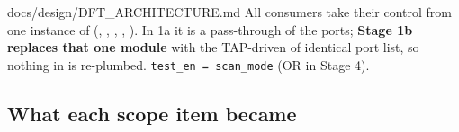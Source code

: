 \begin{relocated}{docs/design/DFT_ARCHITECTURE.md}
All consumers take their control from one instance of
 (,
, , ,
). In 1a it is a pass-through of the ports;
\textbf{Stage 1b replaces that one module} with the TAP-driven
 of identical port list, so nothing in  is
re-plumbed.
\texttt{test\_\allowbreak{}en\ =\allowbreak{}\ scan\_\allowbreak{}mode}
(OR  in Stage 4).

\subsection{What each scope item became}\label{tm:ch:dft-architecture:142-what-each-scope-item-became}

{\footnotesize\setlength{\tabcolsep}{3pt}

}
\end{relocated}
